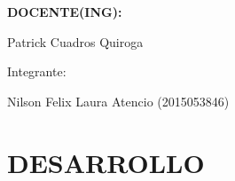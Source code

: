 \documentclass[12pt,letterpaper]{article}
\begin{document}
\begin{titlepage}
\begin{center}
\vspace*{0.3in}
\begin{Large}
\textbf{DOCENTE(ING):} \\
\end{Large}

\vspace*{0.1in}
\begin{large}
 Patrick Cuadros Quiroga\\
\end{large}

\vspace*{0.2in}
\vspace*{0.1in}
\begin{large}
Integrante: \\
\begin{flushleft}
Nilson Felix Laura Atencio	\hfill	(2015053846) 
\end{flushleft}
\end{large}
\end{center}

\end{titlepage}



\thispagestyle{empty} %
\newpage
\setcounter{page}{1} %


\section{DESARROLLO}
\end{document}
